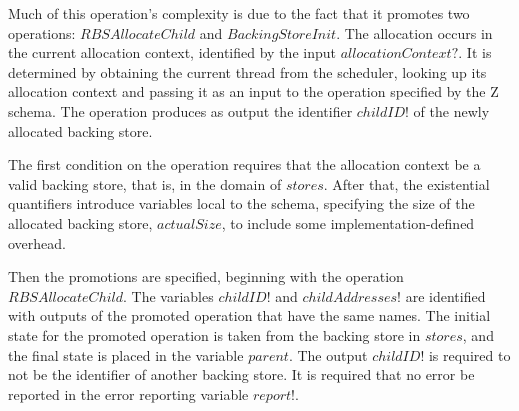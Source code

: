 \documentclass[a4paper,10pt]{report}
\begin{document}
Much of this operation's complexity is due to the fact that it
promotes two operations: $RBSAllocateChild$ and $BackingStoreInit$.
The allocation occurs in the current allocation context, identified by
the input $allocationContext?$.
It is determined by obtaining the current thread from the scheduler,
looking up its allocation context and passing it as an input to the
operation specified by the Z schema.
The operation produces as output the identifier $childID!$ of the
newly allocated backing store.

The first condition on the operation requires that the allocation
context be a valid backing store, that is, in the domain of $stores$.
After that, the existential quantifiers introduce variables local to
the schema, specifying the size of the allocated backing store,
$actualSize$, to include some implementation-defined overhead.

Then the promotions are specified, beginning with the operation
$RBSAllocateChild$.
The variables $childID!$ and $childAddresses!$ are identified with
outputs of the promoted operation that have the same names.
The initial state for the promoted operation is taken from the backing
store in $stores$, and the final state is placed in the variable
$parent$.
The output $childID!$ is required to not be the identifier of another
backing store.
It is required that no error be reported in the error reporting
variable $report!$.
\end{document}
